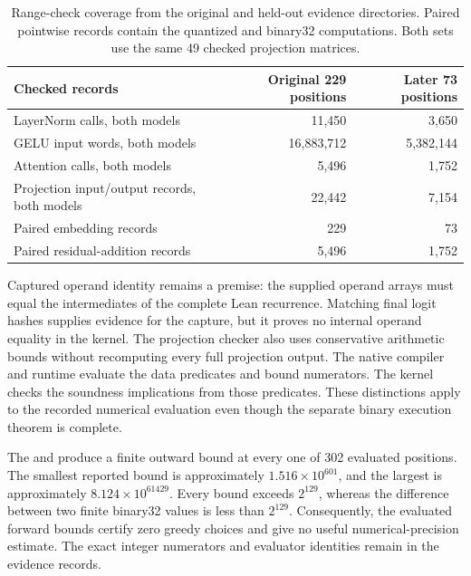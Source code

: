 \begin{table}[ht]
\centering
\small
\begin{tabular}{lrr}
\toprule
Checked records & Original 229 positions & Later 73 positions\\
\midrule
LayerNorm calls, both models & 11,450 & 3,650\\
GELU input words, both models & 16,883,712 & 5,382,144\\
Attention calls, both models & 5,496 & 1,752\\
Projection input/output records, both models & 22,442 & 7,154\\
Paired embedding records & 229 & 73\\
Paired residual-addition records & 5,496 & 1,752\\
\bottomrule
\end{tabular}
\caption{Range-check coverage from the original and held-out evidence directories.  Paired pointwise records contain the quantized and binary32 computations.  Both sets use the same 49 checked projection matrices.}
\label{tab:ranges}
\end{table}

Captured operand identity remains a premise: the supplied operand arrays must equal the intermediates of the complete Lean recurrence.  Matching final logit hashes supplies evidence for the capture, but it proves no internal operand equality in the kernel.  The projection checker also uses conservative arithmetic bounds without recomputing every full projection output.  The native compiler and runtime evaluate the data predicates and bound numerators.  The kernel checks the soundness implications from those predicates.  These distinctions apply to the recorded numerical evaluation even though the separate binary execution theorem is complete.

The  and  produce a finite outward bound at every one of 302 evaluated positions.  The smallest reported bound is approximately $1.516\times10^{601}$, and the largest is approximately $8.124\times10^{61429}$.  Every bound exceeds $2^{129}$, whereas the difference between two finite binary32 values is less than $2^{129}$.  Consequently, the evaluated forward bounds certify zero greedy choices and give no useful numerical-precision estimate.  The exact integer numerators and evaluator identities remain in the evidence records.

